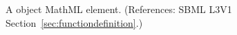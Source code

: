 A \FunctionDefinition object  MathML 
element.  (References: SBML L3V1 Section~\ref{sec:functiondefinition}.)
